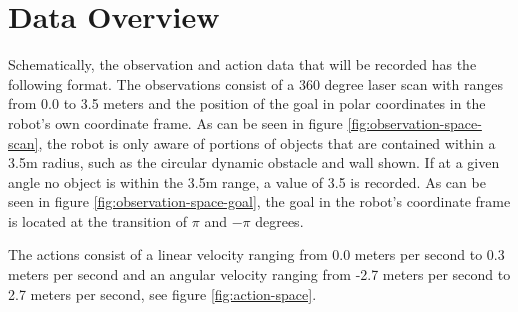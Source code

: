 \section{Data Overview}
Schematically, the observation and action data that will be recorded has the following format. The observations consist of a 360 degree laser scan with ranges from 0.0 to 3.5 meters and the position of the goal in polar coordinates in the robot’s own coordinate frame. As can be seen in figure \ref{fig:observation-space-scan}, the robot is only aware of portions of objects that are contained within a 3.5m radius, such as the circular dynamic obstacle and wall shown. If at a given angle no object is within the 3.5m range, a value of 3.5 is recorded. As can be seen in figure \ref{fig:observation-space-goal}, the goal in the robot's coordinate frame is located at the transition of $\pi$ and $-\pi$ degrees.
 
 The actions consist of a linear velocity ranging from 0.0 meters per second to 0.3 meters per second and an angular velocity ranging from -2.7 meters per second to 2.7 meters per second, see figure \ref{fig:action-space}.
 

